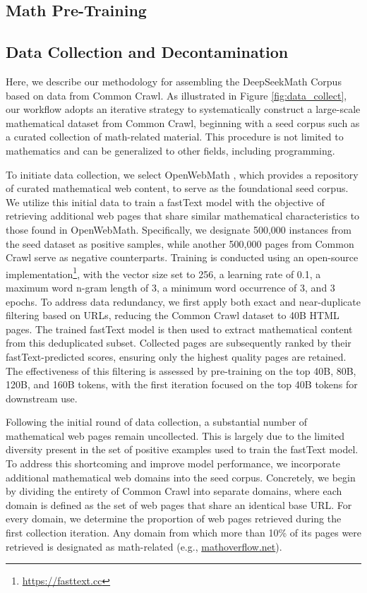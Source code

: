 \begin{itemize}[topsep=0pt]
\section{Math Pre-Training}

\subsection{Data Collection and Decontamination}
Here, we describe our methodology for assembling the DeepSeekMath Corpus based on data from Common Crawl. As illustrated in Figure \ref{fig:data_collect}, our workflow adopts an iterative strategy to systematically construct a large-scale mathematical dataset from Common Crawl, beginning with a seed corpus such as a curated collection of math-related material. This procedure is not limited to mathematics and can be generalized to other fields, including programming.

To initiate data collection, we select OpenWebMath \citep{openwebmath}, which provides a repository of curated mathematical web content, to serve as the foundational seed corpus. We utilize this initial data to train a fastText model \citep{joulin2016fasttext} with the objective of retrieving additional web pages that share similar mathematical characteristics to those found in OpenWebMath. Specifically, we designate 500,000 instances from the seed dataset as positive samples, while another 500,000 pages from Common Crawl serve as negative counterparts. Training is conducted using an open-source implementation\footnote{\url{https://fasttext.cc}}, with the vector size set to 256, a learning rate of 0.1, a maximum word n-gram length of 3, a minimum word occurrence of 3, and 3 epochs. To address data redundancy, we first apply both exact and near-duplicate filtering based on URLs, reducing the Common Crawl dataset to 40B HTML pages. The trained fastText model is then used to extract mathematical content from this deduplicated subset. Collected pages are subsequently ranked by their fastText-predicted scores, ensuring only the highest quality pages are retained. The effectiveness of this filtering is assessed by pre-training on the top 40B, 80B, 120B, and 160B tokens, with the first iteration focused on the top 40B tokens for downstream use.

Following the initial round of data collection, a substantial number of mathematical web pages remain uncollected. This is largely due to the limited diversity present in the set of positive examples used to train the fastText model. To address this shortcoming and improve model performance, we incorporate additional mathematical web domains into the seed corpus. Concretely, we begin by dividing the entirety of Common Crawl into separate domains, where each domain is defined as the set of web pages that share an identical base URL. For every domain, we determine the proportion of web pages retrieved during the first collection iteration. Any domain from which more than 10\% of its pages were retrieved is designated as math-related (e.g., \url{mathoverflow.net}). 


\end{itemize}
